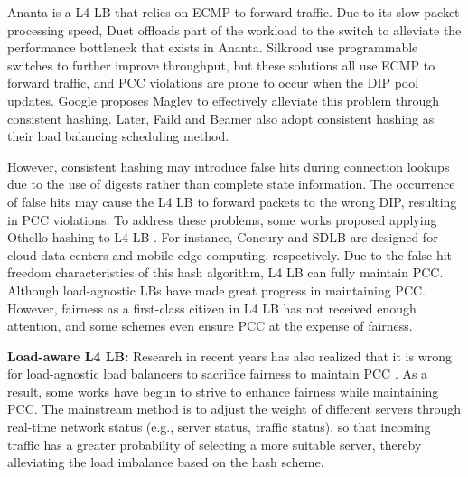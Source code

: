 Ananta \cite{patel2013ananta} is a L4 LB that relies on ECMP to forward traffic. Due to its slow packet processing speed, Duet \cite{gandhi2014duet} offloads part of the workload to the switch to alleviate the performance bottleneck that exists in Ananta. Silkroad \cite{miao2017silkroad} use programmable switches to further improve throughput, but these solutions all use ECMP to forward traffic, and PCC violations are prone to occur when the DIP pool updates. Google proposes Maglev \cite{eisenbud2016maglev} to effectively alleviate this problem through consistent hashing. Later, Faild \cite{araujo2018balancing} and Beamer \cite{olteanu2018stateless} also adopt consistent hashing as their load balancing scheduling method.

However, consistent hashing may introduce false hits during connection lookups due to the use of digests rather than complete state information. The occurrence of false hits may cause the L4 LB to forward packets to the wrong DIP, resulting in PCC violations. To address these problems, some works proposed applying Othello hashing to L4 LB \cite{yu2018memory}. For instance, Concury \cite{shi2020concury} and SDLB \cite{yu2017sdlb} are designed for cloud data centers and mobile edge computing, respectively. Due to the false-hit freedom characteristics of this hash algorithm, L4 LB can fully maintain PCC. Although load-agnostic LBs have made great progress in maintaining PCC. However, fairness as a first-class citizen in L4 LB has not received enough attention, and some schemes even ensure PCC at the expense of fairness.

\textbf{Load-aware L4 LB:}
Research in recent years has also realized that it is wrong for load-agnostic load balancers to sacrifice fairness to maintain PCC \cite{zhang2020fast, barbette2021cheetah, yao2022hlb}. As a result, some works have begun to strive to enhance fairness while maintaining PCC. The mainstream method is to adjust the weight of different servers through real-time network status (e.g., server status, traffic status), so that incoming traffic has a greater probability of selecting a more suitable server, thereby alleviating the load imbalance based on the hash scheme.

